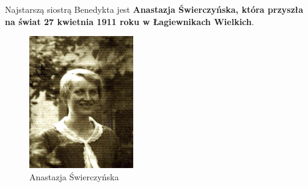 Najstarszą siostrą Benedykta jest \textbf{Anastazja Świerczyńska, która przyszła na świat 27 kwietnia 1911 roku w Łagiewnikach Wielkich}.

\begin{figure}[!h]
\begin{center}
\includegraphics[width=0.4\textwidth]{photo/anastazja_swierczynska_1.jpg}
\caption{Anastazja Świerczyńska}
\label{rys:anastazja_swierczynska_1}
\end{center}
\end{figure}

